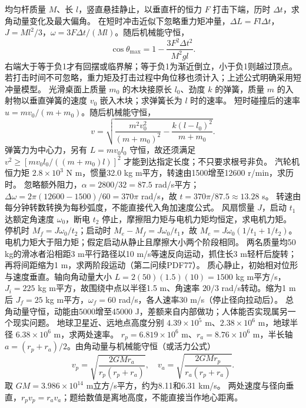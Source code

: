 \problemtext 均匀杆质量 $M$、长 $l$，竖直悬挂静止，以垂直杆的恒力 $F$ 打击下端，历时 $\Delta t$，求角动量变化及最大偏角。
\workings 在短时冲击近似下忽略重力矩冲量，$\Delta L=Fl\Delta t$，$J=Ml^2/3$，$\omega=3F\Delta t/(Ml)$。随后机械能守恒，
\[
\cos\theta_{\max}=1-\frac{3F^2\Delta t^2}{M^2gl}.
\]
右端大于等于负1才有回摆或临界解；等于负1为渐近倒立，小于负1则越过顶点。
\crosscheck 若打击时间不可忽略，重力矩及打击过程中角位移也须计入；上述公式明确采用短冲量模型。
\problemtext 光滑桌面上质量 $m_0$ 的木块接原长 $l_0$、劲度 $k$ 的弹簧，质量 $m$ 的入射物以垂直弹簧的速度 $v_0$ 嵌入木块；求弹簧长为 $l$ 时的速率。
\workings 短时碰撞后的速率 $u=mv_0/(m+m_0)$。随后机械能守恒，
\[
v=\sqrt{\frac{m^2v_0^2}{(m+m_0)^2}-\frac{k(l-l_0)^2}{m+m_0}}.
\]
\crosscheck 弹簧力为中心力，另有 $L=mv_0l_0$ 守恒，故还须满足 $v^2\ge [mv_0l_0/((m+m_0)l)]^2$ 才能到达指定长度；不只要求根号非负。
\problemtext 汽轮机恒力矩 $2.8\times10^3$ N m，惯量32.0 kg m平方，转速由1500增至12600 r/min，求历时。
\workings 忽略额外阻力，$\alpha=2800/32=87.5$ rad/s平方；$\Delta\omega=2\pi(12600-1500)/60=370\pi$ rad/s，故 $t=370\pi/87.5\approx13.28$ s。
\crosscheck 转速由每分钟转数转换为每秒弧度，不能直接代入角加速度公式。
\problemtext 风扇惯量 $J$，启动 $t_1$ 达额定角速度 $\omega_0$，断电 $t_2$ 停止，摩擦阻力矩与电机力矩均恒定，求电机力矩。
\workings 停机时 $M_f=J\omega_0/t_2$；启动时 $M_e-M_f=J\omega_0/t_1$，故 $M_e=J\omega_0(1/t_1+1/t_2)$。
\crosscheck 电机力矩大于阻力矩；假定启动从静止且摩擦大小两个阶段相同。
\problemtext 两名质量均50 kg的滑冰者沿相距3 m平行路径以10 m/s等速反向运动，抓住长3 m轻杆后旋转；再将间距缩为1 m，求两阶段运动（第二问续PDF77）。
\workings 质心静止，初始相对位形与速度垂直。轴向角动量大小 $L=2(50)(1.5)(10)=1500$ kg m平方/s，$J_i=225$ kg m平方，故围绕中点以半径1.5 m、角速率 $20/3$ rad/s转动。缩为1 m后 $J_f=25$ kg m平方，$\omega_f=60$ rad/s，各人速率30 m/s（停止径向拉动后）。
\crosscheck 总角动量守恒，动能由5000增至45000 J，差额来自内部做功；人体能否实现属另一个现实问题。
\problemtext 地球卫星近、远地点高度分别 $4.39\times10^5$ m、$2.38\times10^6$ m，地球半径 $6.38\times10^6$ m，求两处速率。
\workings $r_p=6.819\times10^6$ m、$r_a=8.76\times10^6$ m，半长轴 $a=(r_p+r_a)/2$。由角动量与机械能守恒（或活力公式）
\[
v_p=\sqrt{\frac{2GM r_a}{r_p(r_p+r_a)}},\quad
v_a=\sqrt{\frac{2GM r_p}{r_a(r_p+r_a)}}.
\]
取 $GM=3.986\times10^{14}$ m立方/s平方，约为8.11和6.31 km/s。
\crosscheck 两处速度与径向垂直，$r_pv_p=r_av_a$；题给数值是离地高度，不能直接当作地心距离。

